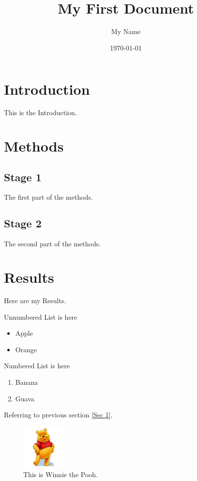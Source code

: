 \documentclass[a4paper,12pt]{article}
\begin{document}
        \title{My First Document}
        \author{My Name}
        \date{\today}
        \maketitle
		
		\tableofcontents
		\newpage
		
        \section{Introduction}
        This is the Introduction.

        \section{Methods}
        \subsection{Stage 1}
        The first part of the methods.
        \label{Sec 1}
        
        \subsection{Stage 2}
        The second part of the methods.

        \section{Results}
        Here are my Results.
        \newline
        
        Unnumbered List is here
        \begin{itemize}
        	\item Apple
        	\item Orange
        \end{itemize}
    
    	Numbered List is here
    	\begin{enumerate}
    		\item Banana
    		\item Guava
    	\end{enumerate}
    
    Referring to previous section \ref{Sec 1}.
        
    \begin{figure}[hb]
    	\centering
    	\includegraphics[width=0.2\textwidth]{time1.jpg}
    	\caption{This is Winnie the Pooh.}
    	\label{WTP}
    \end{figure}
\end{document}
